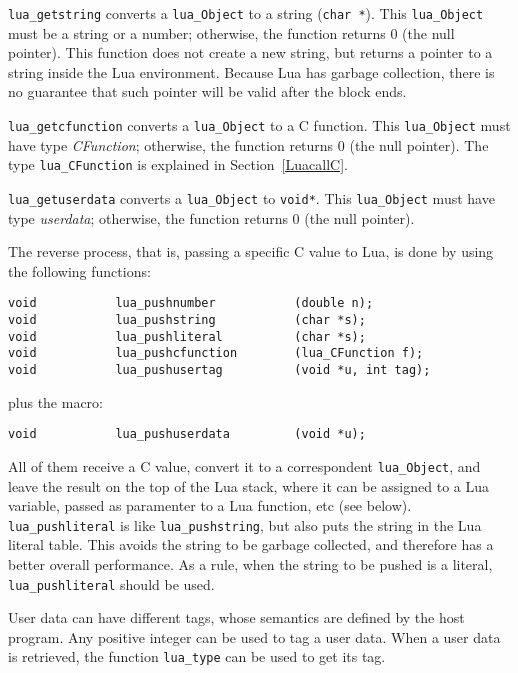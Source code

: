 \verb'lua_getstring' converts a \verb'lua_Object' to a string (\verb'char *').
This \verb'lua_Object' must be a string or a number;
otherwise, the function returns 0 (the null pointer).
This function does not create a new string, but returns a pointer to
a string inside the Lua environment.
Because Lua has garbage collection, there is no guarantee that such
pointer will be valid after the block ends.

\verb'lua_getcfunction' converts a \verb'lua_Object' to a C function.
This \verb'lua_Object' must have type {\em CFunction\/};
otherwise, the function returns 0 (the null pointer).
The type \verb'lua_CFunction' is explained in Section~\ref{LuacallC}.

\verb'lua_getuserdata' converts a \verb'lua_Object' to \verb'void*'.
This \verb'lua_Object' must have type {\em userdata\/};
otherwise, the function returns 0 (the null pointer).

The reverse process, that is, passing a specific C value to Lua,
is done by using the following functions:
\begin{verbatim}
void           lua_pushnumber           (double n);
void           lua_pushstring           (char *s);
void           lua_pushliteral          (char *s);
void           lua_pushcfunction        (lua_CFunction f);
void           lua_pushusertag          (void *u, int tag);
\end{verbatim}
plus the macro:
\begin{verbatim}
void           lua_pushuserdata         (void *u);
\end{verbatim}
All of them receive a C value,
convert it to a correspondent \verb'lua_Object',
and leave the result on the top of the Lua stack,
where it can be assigned to a Lua variable,
passed as paramenter to a Lua function, etc (see below). \label{pushing}
\verb'lua_pushliteral' is like \verb'lua_pushstring',
but also puts the string in the Lua literal table.
This avoids the string to be garbage collected,
and therefore has a better overall performance.
As a rule, when the string to be pushed is a literal,
\verb'lua_pushliteral' should be used.

User data can have different tags,
whose semantics are defined by the host program.
Any positive integer can be used to tag a user data.
When a user data is retrieved,
the function \verb'lua_type' can be used to get its tag.

